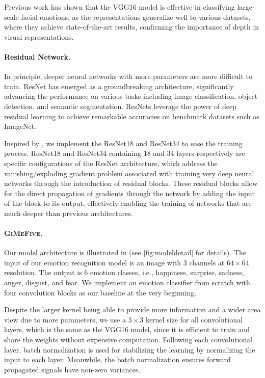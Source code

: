 Previous work has shown that the VGG16 model is effective in classifying large-scale facial emotions, 
as the representations generalize well to various datasets, 
where they achieve state-of-the-art results, 
confirming the importance of depth in visual representations. 

\paragraph{Residual Network.}
In principle, 
deeper neural networks with more parameters are more difficult to train. 
ResNet has emerged as a groundbreaking architecture, 
significantly advancing the performance on various tasks including image classification, 
object detection, and semantic segmentation. 
ResNets leverage the power of deep residual learning to achieve remarkable accuracies on benchmark datasets such as ImageNet. 

Inspired by \citet{HeZRS16}, 
we implement the ResNet18 and ResNet34 to ease the training process. 
ResNet18 and ResNet34 containing 18 and 34 layers respectively are specific configurations of the ResNet architecture, 
which address the vanishing/exploding gradient problem associated with training very deep neural networks through the introduction of residual blocks. 
These residual blocks allow for the direct propagation of gradients through the network by adding the input of the block to its output, 
effectively enabling the training of networks that are much deeper than previous architectures. 

\paragraph{\textsc{GiMeFive}.}
Our model architecture is illustrated in  (see \cref{fig:modeldetail} for details). 
The input of our emotion recognition model is an image with 3 channels at $64 \times 64 $ resolution. 
The output is 6 emotion classes, i.e., happiness, surprise, sadness, anger, disgust, and fear. 
We implement an emotion classifier from scratch with four convolution blocks as our baseline at the very beginning. 

Despite the larger kernel being able to provide more information and a wider area view due to more parameters, 
we use a $3 \times 3$ kernel size for all convolutional layers, 
which is the same as the VGG16 model, 
since it is efficient to train and share the weights without expensive computation. 
Following each convolutional layer, 
batch normalization is used for stabilizing the learning by normalizing the input to each layer. 
Meanwhile, 
the batch normalization ensures forward propagated signals have non-zero variances. 

